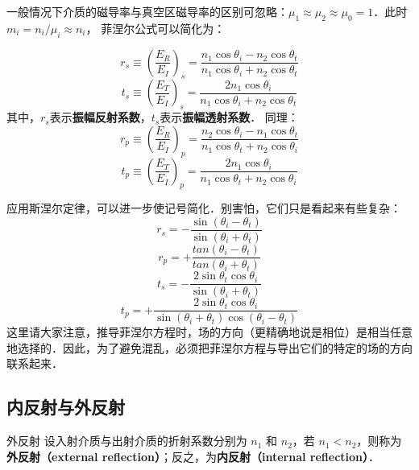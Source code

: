 一般情况下介质的磁导率与真空区磁导率的区别可忽略：$\mu_1\approx\mu_2\approx\mu_0=1$．此时$m_i=n_i/\mu_i \approx n_i$， 菲涅尔公式可以简化为：

\begin{equation}\label{Fresnl_eq3}
r_s \equiv \left(\frac{E_R}{E_I}\right)_s = \frac{n_1\cos{\theta_i} - n_2\cos\theta_t}{n_1\cos\theta_i + n_2\cos\theta_t}
\end{equation}
\begin{equation}\label{Fresnl_eq4}
t_s \equiv \left(\frac{E_T}{E_I}\right)_s =  \frac{2 n_1\cos\theta_i}{n_1\cos\theta_i + n_2\cos\theta_t}
\end{equation}
其中，$r_s$表示\textbf{振幅反射系数}，$t_s$表示\textbf{振幅透射系数}．
同理：
\begin{equation}\label{Fresnl_eq5}
r_p \equiv \left(\frac{E_R}{E_I}\right)_p = \frac{n_2\cos{\theta_i} - n_1\cos\theta_t}{n_1\cos\theta_t + n_2\cos\theta_i}
\end{equation}
\begin{equation}\label{Fresnl_eq6}
t_p \equiv \left(\frac{E_T}{E_I}\right)_p =  \frac{2 n_1\cos\theta_i}{n_1\cos\theta_t + n_2\cos\theta_i}
\end{equation}

应用斯涅尔定律，可以进一步使记号简化．别害怕，它们只是看起来有些复杂：
\begin{equation}\label{Fresnl_eq7}
r_s = -\frac{\sin(\theta_i - \theta_t)}{\sin(\theta_i + \theta_t)}
\end{equation}
\begin{equation}\label{Fresnl_eq8}
r_p = +\frac{tan(\theta_i - \theta_t)}{tan(\theta_i + \theta_t)}
\end{equation}
\begin{equation}\label{Fresnl_eq9}
t_s = -\frac{2\sin\theta_t\cos\theta_i}{\sin(\theta_i + \theta_t)}
\end{equation}
\begin{equation}\label{Fresnl_eq10}
t_p = +\frac{2\sin\theta_t\cos\theta_i}{\sin(\theta_i + \theta_t)\cos(\theta_i - \theta_t)}
\end{equation}
这里请大家注意，推导菲涅尔方程时，场的方向（更精确地说是相位）是相当任意地选择的．因此，为了避免混乱，必须把菲涅尔方程与导出它们的特定的场的方向联系起来．

\subsection{内反射与外反射}
\begin{definition}{外反射}
设入射介质与出射介质的折射系数分别为 $n_1$ 和 $n_2$，若 $n_1<n_2$，则称为\textbf{外反射（external reflection）}；反之，为\textbf{内反射（internal reflection）}．
\end{definition}

